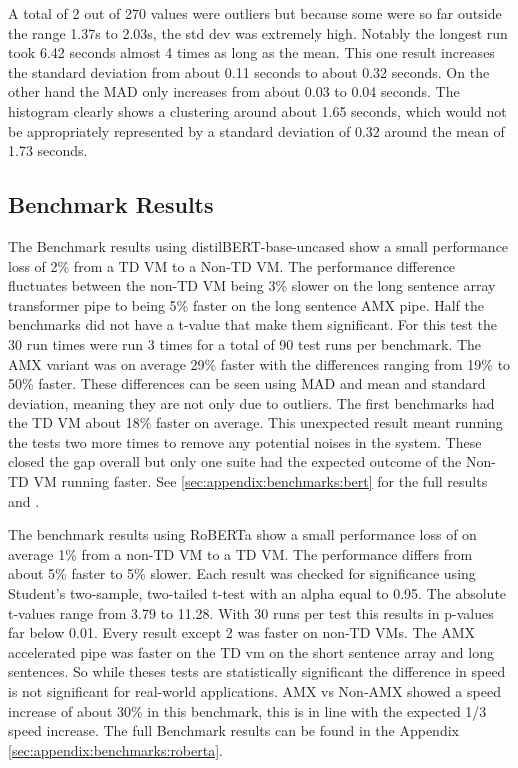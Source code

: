 A total of 2 out of 270 values were outliers but because some were so far outside the range 1.37s to 2.03s, the std dev was extremely high. Notably the longest run took 6.42 seconds almost 4 times as long as the mean. This one result increases the standard deviation from about 0.11 seconds to about 0.32 seconds. On the other hand the MAD only increases from about 0.03 to 0.04 seconds. The histogram clearly shows a clustering around about  1.65 seconds, which would not be appropriately represented by a standard deviation of 0.32 around the mean of 1.73 seconds.


\subsection{Benchmark Results}
The Benchmark results using distilBERT-base-uncased show a small performance loss of 2\% from a TD VM to a Non-TD VM. The performance difference fluctuates between the non-TD VM being 3\% slower on the long sentence array transformer pipe to being 5\% faster on the long sentence AMX pipe. Half the benchmarks did not have a t-value that make them significant. For this test the 30 run times were run 3 times for a total of 90 test runs per benchmark. The AMX variant was on average 29\% faster with the differences ranging from 19\% to 50\% faster.
These differences can be seen using MAD and mean and standard deviation, meaning they are not only due to outliers. The first benchmarks had the TD VM about 18\% faster on average. This unexpected result meant running the tests two more times to remove any potential noises in the system. These closed the gap overall but only one suite had the expected outcome of the Non-TD VM running faster. See \ref{sec:appendix:benchmarks:bert} for the full results and .

The benchmark results using RoBERTa show a small performance loss of on average 1\% from a non-TD VM to a TD VM. The performance differs from about 5\% faster to 5\% slower. Each result was checked for significance using Student’s two-sample, two-tailed t-test with an alpha equal to 0.95. The absolute t-values range from 3.79 to 11.28. With 30 runs per test this results in p-values far below 0.01. Every result except 2 was faster on non-TD VMs. The AMX accelerated pipe was faster on the TD vm on the short sentence array and long sentences. So while theses tests are statistically significant the difference in speed is not significant for real-world applications. AMX vs Non-AMX showed a speed increase of about 30\% in this benchmark, this is in line with the expected 1/3 speed increase.
The full Benchmark results can be found in the Appendix \ref{sec:appendix:benchmarks:roberta}.

